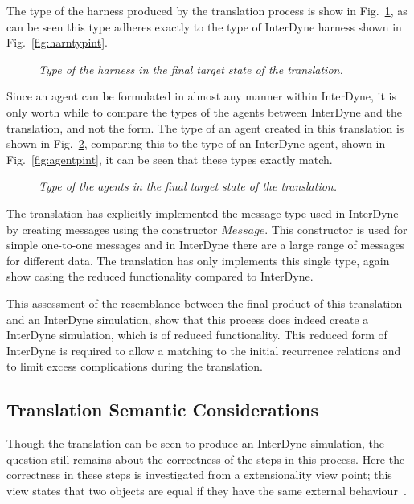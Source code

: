 \documentclass{article}
\begin{document}
The type of the harness produced by the translation process is show in Fig.~\ref{fig:harntyptrans}, as can be seen this type adheres exactly to the type of InterDyne harness shown in Fig.~\ref{fig:harntypint}.
\begin{figure}[H]
	\centering
	
	\caption{\it Type of the harness in the final target state of the translation.}
	\label{fig:harntyptrans}
\end{figure} 

Since an agent can be formulated in almost any manner within InterDyne, it is only worth while to compare the types of the agents between InterDyne and the translation, and not the form. The type of an agent created in this translation is shown in Fig.~\ref{fig:agenttrans}, comparing this to the type of an InterDyne agent, shown in Fig.~\ref{fig:agentpint}, it can be seen that these types exactly match. 

\begin{figure}[H]
	\centering
	
	\caption{\it Type of the agents in the final target state of the translation.}
	\label{fig:agenttrans}
\end{figure} 

The translation has explicitly implemented the message type used in InterDyne by creating messages using the constructor $Message$. This constructor is used for simple one-to-one messages and in InterDyne there are a large range of messages for different data. The translation has only implements this single type, again show casing the reduced functionality compared to InterDyne.   

This assessment of the resemblance between the final product of this translation and an InterDyne simulation, show that this process does indeed create a InterDyne simulation, which is of reduced functionality. This reduced form of InterDyne is required to allow a matching to the initial recurrence relations and to limit excess complications during the translation.

\subsection{Translation Semantic Considerations}
Though the translation can be seen to produce an InterDyne simulation, the question still remains about the correctness of the steps in this process. Here the correctness in these steps is investigated from a extensionality view point; this view  states that two objects are equal if they have the same external behaviour~\cite{extnesiably}. 
\end{document}
